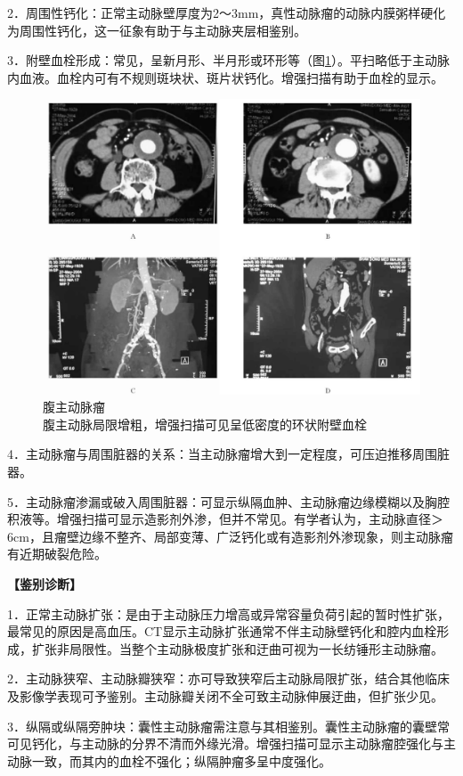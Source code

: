 2．周围性钙化：正常主动脉壁厚度为2～3mm，真性动脉瘤的动脉内膜粥样硬化为周围性钙化，这一征象有助于与主动脉夹层相鉴别。

3．附壁血栓形成：常见，呈新月形、半月形或环形等（图\ref{fig10-4}）。平扫略低于主动脉内血液。血栓内可有不规则斑块状、斑片状钙化。增强扫描有助于血栓的显示。

\begin{figure}[!htbp]
 \centering
 \includegraphics[width=.7\textwidth,height=\textheight,keepaspectratio]{./images/Image00263.jpg}
 \captionsetup{justification=centering}
 \caption{腹主动脉瘤\\{\small 腹主动脉局限增粗，增强扫描可见呈低密度的环状附壁血栓}}
 \label{fig10-4}
  \end{figure} 

4．主动脉瘤与周围脏器的关系：当主动脉瘤增大到一定程度，可压迫推移周围脏器。

5．主动脉瘤渗漏或破入周围脏器：可显示纵隔血肿、主动脉瘤边缘模糊以及胸腔积液等。增强扫描可显示造影剂外渗，但并不常见。有学者认为，主动脉直径＞6cm，且瘤壁边缘不整齐、局部变薄、广泛钙化或有造影剂外渗现象，则主动脉瘤有近期破裂危险。

\textbf{【鉴别诊断】}

1．正常主动脉扩张：是由于主动脉压力增高或异常容量负荷引起的暂时性扩张，最常见的原因是高血压。CT显示主动脉扩张通常不伴主动脉壁钙化和腔内血栓形成，扩张非局限性。当整个主动脉极度扩张和迂曲可视为一长纺锤形主动脉瘤。

2．主动脉狭窄、主动脉瓣狭窄：亦可导致狭窄后主动脉局限扩张，结合其他临床及影像学表现可予鉴别。主动脉瓣关闭不全可致主动脉伸展迂曲，但扩张少见。

3．纵隔或纵隔旁肿块：囊性主动脉瘤需注意与其相鉴别。囊性主动脉瘤的囊壁常可见钙化，与主动脉的分界不清而外缘光滑。增强扫描可显示主动脉瘤腔强化与主动脉一致，而其内的血栓不强化；纵隔肿瘤多呈中度强化。

